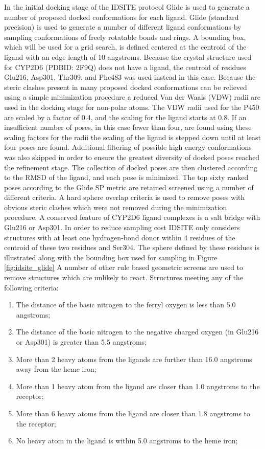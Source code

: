 In the initial docking stage of the IDSITE protocol Glide is used to generate a number of proposed docked conformations for each ligand.
Glide (standard precision) is used to generate a number of different ligand conformations by sampling conformations of freely rotatable bonds and rings.
A bounding box, which will be used for a grid search, is defined centered at the centroid of the ligand with an edge length of 10 angstroms.
Because the crystal structure used for CYP2D6 (PDBID: 2F9Q) does not have a ligand, the centroid of residues Glu216, Asp301, Thr309, and Phe483 was used instead in this case.
Because the steric clashes present in many proposed docked conformations can be relieved using a simple minimization procedure a reduced Van der Waals (VDW) radii are used in the docking stage for non-polar atoms.
The VDW radii used for the P450 are scaled by a factor of 0.4, and the scaling for the ligand starts at 0.8.
If an insufficient number of poses, in this case fewer than four, are found using these scaling factors for the radii the scaling of the ligand is stepped down until at least four poses are found.
Additional filtering of possible high energy conformations was also skipped in order to ensure the greatest diversity of docked poses reached the refinement stage.
The collection of docked poses are then clustered according to the RMSD of the ligand, and each pose is minimized.
The top sixty ranked poses according to the Glide SP metric are retained screened using a number of different criteria.
A hard sphere overlap criteria is used to remove poses with obvious steric clashes which were not removed during the minimization procedure.
A conserved feature of CYP2D6 ligand complexes is a salt bridge with Glu216 or Asp301.
In order to reduce sampling cost IDSITE only considers structures with at least one hydrogen-bond donor within 4 residues of the centroid of these two residues and Ser304.
The sphere defined by these residues is illustrated along with the bounding box used for sampling in Figure \ref{fig:idsite_glide}
A number of other rule based geometric screens are used to remove structures which are unlikely to react.
Structures meeting any of the following criteria:
\begin{enumerate}
\item The distance of the basic nitrogen to the ferryl oxygen is less than 5.0 angstroms;
\item The distance of the basic nitrogen to the negative charged oxygen (in Glu216 or Asp301) is greater than 5.5 angstroms;
\item More than 2 heavy atoms from the ligands are further than 16.0 angstroms away from the heme iron;
\item More than 1 heavy atom from the ligand are closer than 1.0 angstroms to the receptor;
\item More than 6 heavy atoms from the ligand are closer than 1.8 angstroms to the receptor;
\item No heavy atom in the ligand is within 5.0 angstroms to the heme iron;
\end{enumerate}
